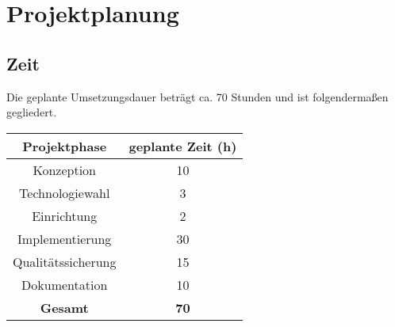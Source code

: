 \section{Projektplanung}

\subsection{Zeit}
Die geplante Umsetzungsdauer beträgt ca. 70 Stunden und ist folgendermaßen
gegliedert.

\begin{center}
    \begin{tabular}{ |c|c| }
        \hline
        \textbf{Projektphase} & \textbf{geplante Zeit (h)} \\ \hline
        Konzeption            & 10                         \\
        Technologiewahl       & 3                          \\
        Einrichtung           & 2                          \\
        Implementierung       & 30                         \\
        Qualitätssicherung    & 15                         \\
        Dokumentation         & 10                         \\ \hline
        \textbf{Gesamt}       & \textbf{70}                \\
        \hline
    \end{tabular}
\end{center}





